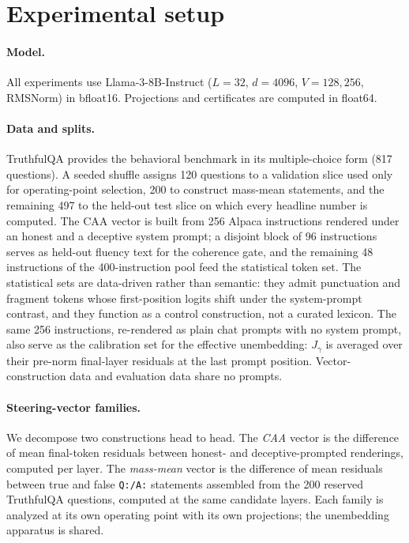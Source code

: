 \section{Experimental setup}\label{sec:setup}

\paragraph{Model.}
All experiments use Llama-3-8B-Instruct \citep{grattafiori2024llama3} ($L=32$, $d=4096$, $V=128{,}256$, RMSNorm) in bfloat16. Projections and certificates are computed in float64.

\paragraph{Data and splits.}
TruthfulQA \citep{lin2022truthfulqa} provides the behavioral benchmark in its multiple-choice form (817 questions). A seeded shuffle assigns 120 questions to a validation slice used only for operating-point selection, 200 to construct mass-mean statements, and the remaining 497 to the held-out test slice on which every headline number is computed. The CAA vector is built from 256 Alpaca instructions \citep{taori2023alpaca} rendered under an honest and a deceptive system prompt; a disjoint block of 96 instructions serves as held-out fluency text for the coherence gate, and the remaining 48 instructions of the 400-instruction pool feed the statistical token set. The statistical sets are data-driven rather than semantic: they admit punctuation and fragment tokens whose first-position logits shift under the system-prompt contrast, and they function as a control construction, not a curated lexicon. The same 256 instructions, re-rendered as plain chat prompts with no system prompt, also serve as the calibration set for the effective unembedding: $J_{\gamma}$ is averaged over their pre-norm final-layer residuals at the last prompt position. Vector-construction data and evaluation data share no prompts.

\paragraph{Steering-vector families.}
We decompose two constructions head to head. The \emph{CAA} vector \citep{rimsky2024caa} is the difference of mean final-token residuals between honest- and deceptive-prompted renderings, computed per layer. The \emph{mass-mean} vector \citep{marks2024geometry} is the difference of mean residuals between true and false \texttt{Q:/A:} statements assembled from the 200 reserved TruthfulQA questions, computed at the same candidate layers. Each family is analyzed at its own operating point with its own projections; the unembedding apparatus is shared.

